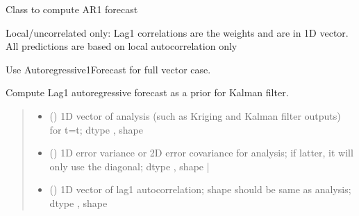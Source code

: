 \documentclass[letterpaper,10pt,english]{sphinxmanual}
\begin{document}
\begin{fulllineitems}
\label{\detokenize{kalman:glomar_gridding.autoregressive_kalman.Autoregressive1ForecastUncorr}}
\pysigstartsignatures
\pysiglinewithargsret
{}
{\sphinxparamcomma {}\sphinxparamcomma {}\sphinxparamcomma {}\sphinxparamcomma {}\sphinxparamcomma {}\sphinxparamcomma {}}
{}
\pysigstopsignatures
\sphinxAtStartPar
Class to compute AR1 forecast

\sphinxAtStartPar
Local/uncorrelated only: Lag\sphinxhyphen{}1 correlations are the
weights and are in 1\sphinxhyphen{}D vector. All predictions are based on
local autocorrelation only

\sphinxAtStartPar
Use Autoregressive1Forecast for full vector case.

\sphinxAtStartPar
Compute Lag\sphinxhyphen{}1 autoregressive forecast as a prior for Kalman filter.
\begin{quote}\begin{description}
\begin{itemize}
\item {}
\sphinxAtStartPar
{} () \textendash{} 1D vector of analysis (such as Kriging and
Kalman filter outputs) for t=t;
dtype , shape 

\item {}
\sphinxAtStartPar
{} () \textendash{} 1D error variance or 2D error covariance for analysis;
if latter, it will only use the diagonal;
dtype , shape  | 

\item {}
\sphinxAtStartPar
{} () \textendash{} 1D vector of lag\sphinxhyphen{}1 autocorrelation;
shape should be same as analysis;
dtype , shape 


\end{itemize}
\end{description}
\end{quote}
\end{fulllineitems}
\end{document}
